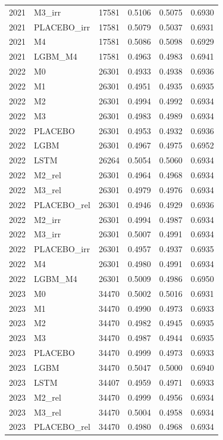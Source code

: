 \begin{tabular}{llrrrr}
2021 & M3\_irr & 17581 & 0.5106 & 0.5075 & 0.6930 \\
2021 & PLACEBO\_irr & 17581 & 0.5079 & 0.5037 & 0.6931 \\
2021 & M4 & 17581 & 0.5086 & 0.5098 & 0.6929 \\
2021 & LGBM\_M4 & 17581 & 0.4963 & 0.4983 & 0.6941 \\
2022 & M0 & 26301 & 0.4933 & 0.4938 & 0.6936 \\
2022 & M1 & 26301 & 0.4951 & 0.4935 & 0.6935 \\
2022 & M2 & 26301 & 0.4994 & 0.4992 & 0.6934 \\
2022 & M3 & 26301 & 0.4983 & 0.4989 & 0.6934 \\
2022 & PLACEBO & 26301 & 0.4953 & 0.4932 & 0.6936 \\
2022 & LGBM & 26301 & 0.4967 & 0.4975 & 0.6952 \\
2022 & LSTM & 26264 & 0.5054 & 0.5060 & 0.6934 \\
2022 & M2\_rel & 26301 & 0.4964 & 0.4968 & 0.6934 \\
2022 & M3\_rel & 26301 & 0.4979 & 0.4976 & 0.6934 \\
2022 & PLACEBO\_rel & 26301 & 0.4946 & 0.4929 & 0.6936 \\
2022 & M2\_irr & 26301 & 0.4994 & 0.4987 & 0.6934 \\
2022 & M3\_irr & 26301 & 0.5007 & 0.4991 & 0.6934 \\
2022 & PLACEBO\_irr & 26301 & 0.4957 & 0.4937 & 0.6935 \\
2022 & M4 & 26301 & 0.4980 & 0.4991 & 0.6934 \\
2022 & LGBM\_M4 & 26301 & 0.5009 & 0.4986 & 0.6950 \\
2023 & M0 & 34470 & 0.5002 & 0.5016 & 0.6931 \\
2023 & M1 & 34470 & 0.4990 & 0.4973 & 0.6933 \\
2023 & M2 & 34470 & 0.4982 & 0.4945 & 0.6935 \\
2023 & M3 & 34470 & 0.4987 & 0.4944 & 0.6935 \\
2023 & PLACEBO & 34470 & 0.4999 & 0.4973 & 0.6933 \\
2023 & LGBM & 34470 & 0.5047 & 0.5000 & 0.6940 \\
2023 & LSTM & 34407 & 0.4959 & 0.4971 & 0.6933 \\
2023 & M2\_rel & 34470 & 0.4999 & 0.4956 & 0.6934 \\
2023 & M3\_rel & 34470 & 0.5004 & 0.4958 & 0.6934 \\
2023 & PLACEBO\_rel & 34470 & 0.4980 & 0.4968 & 0.6934 \\

\end{tabular}
